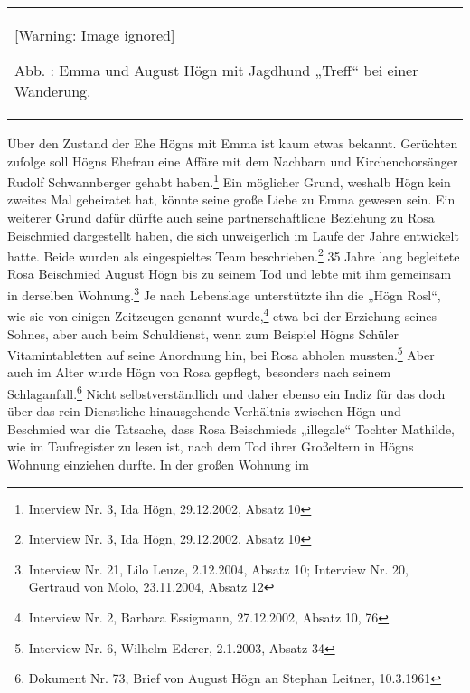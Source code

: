 \documentclass[a4paper]{article}
\newcounter{Abb}
\renewcommand\theAbb{\arabic{Abb}}
\begin{document}
\begin{center}
\begin{minipage}{5.992cm}
\begin{center}
\tablefirsthead{}
\tablehead{}
\tabletail{}
\tablelasttail{}
\begin{supertabular}{m{5.7920003cm}}
  [Warning: Image ignored] %
 
Abb. \stepcounter{Abb}{\theAbb}: Emma und August Högn mit Jagdhund
„Treff“ bei einer Wanderung.\\
\end{supertabular}
\end{center}
\end{minipage}
\end{center}
Über den Zustand der Ehe Högns mit Emma ist kaum etwas bekannt.
Gerüchten zufolge soll Högns Ehefrau eine Affäre mit dem Nachbarn und
Kirchenchorsänger Rudolf Schwannberger gehabt haben.\footnote{
Interview Nr. 3, Ida Högn, 29.12.2002, Absatz 10} Ein möglicher Grund,
weshalb Högn kein zweites Mal geheiratet hat, könnte seine große Liebe
zu Emma gewesen sein. Ein weiterer Grund dafür dürfte auch seine
partnerschaftliche Beziehung zu Rosa Beischmied dargestellt haben, die
sich unweigerlich im Laufe der Jahre entwickelt hatte. Beide wurden als
eingespieltes Team beschrieben.\footnote{ Interview Nr. 3, Ida Högn,
29.12.2002, Absatz 10} 35 Jahre lang begleitete Rosa Beischmied August
Högn bis zu seinem Tod und lebte mit ihm gemeinsam in derselben
Wohnung.\footnote{ Interview Nr. 21, Lilo Leuze, 2.12.2004, Absatz 10;
Interview Nr. 20, Gertraud von Molo, 23.11.2004, Absatz 12} Je nach
Lebenslage unterstützte ihn die „Högn Rosl“, wie sie von einigen
Zeitzeugen genannt wurde,\footnote{ Interview Nr. 2, Barbara Essigmann,
27.12.2002, Absatz 10, 76} etwa bei der Erziehung seines Sohnes, aber
auch beim Schuldienst, wenn zum Beispiel Högns Schüler Vitamintabletten
auf seine Anordnung hin, bei Rosa abholen mussten.\footnote{ Interview
Nr. 6, Wilhelm Ederer, 2.1.2003, Absatz 34} Aber auch im Alter wurde
Högn von Rosa gepflegt, besonders nach seinem Schlaganfall.\footnote{
Dokument Nr. 73, Brief von August Högn an Stephan Leitner, 10.3.1961}
Nicht selbstverständlich und daher ebenso ein Indiz für das doch über
das rein Dienstliche hinausgehende Verhältnis zwischen Högn und
Beschmied war die Tatsache, dass Rosa Beischmieds „illegale“ Tochter
Mathilde, wie im Taufregister zu lesen ist, nach dem Tod ihrer
Großeltern in Högns Wohnung einziehen durfte. In der großen Wohnung im
\end{document}
